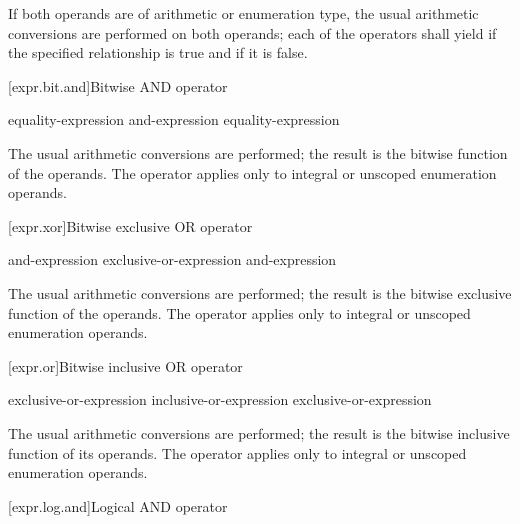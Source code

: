 \pnum
If both operands are of arithmetic or enumeration type, the usual arithmetic
conversions are performed on both operands; each of the operators shall yield
 if the specified relationship is true and  if it is
false.

[expr.bit.and]{Bitwise AND operator}%
%
%
%
%

\begin{bnf}
\br
    equality-expression\br
    and-expression \terminal{\&} equality-expression
\end{bnf}

\pnum
The usual arithmetic conversions are performed; the result is the
bitwise  function of the operands. The operator
applies only to integral or unscoped enumeration operands.

[expr.xor]{Bitwise exclusive OR operator}%
%
%

\begin{bnf}
\br
    and-expression\br
    exclusive-or-expression \terminal{\^{}} and-expression
\end{bnf}

\pnum
The usual arithmetic conversions are performed; the result is the
bitwise exclusive  function of the operands. The
operator applies only to integral or unscoped enumeration operands.

[expr.or]{Bitwise inclusive OR operator}%
%
%

\begin{bnf}
\br
    exclusive-or-expression\br
    inclusive-or-expression \terminal{|} exclusive-or-expression
\end{bnf}

\pnum
The usual arithmetic conversions are performed; the result is the
bitwise inclusive  function of its operands. The
operator applies only to integral or unscoped enumeration operands.

[expr.log.and]{Logical AND operator}%
%
%
%


